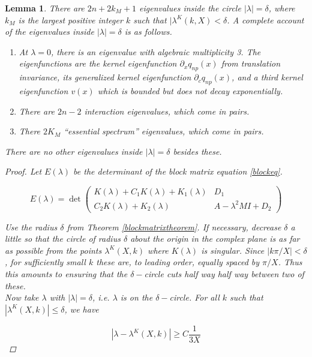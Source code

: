 \documentclass[12pt]{article}
\newtheorem{lemma}{Lemma}
\begin{document}
\begin{lemma}\label{eigcount}
There are $2n + 2 k_M + 1$ eigenvalues inside the circle $|\lambda| = \delta$, where $k_M$ is the largest positive integer $k$ such that $|\lambda^K(k,X) < \delta$. A complete account of the eigenvalues inside $|\lambda| = \delta$ is as follows.
\begin{enumerate}
	\item At $\lambda = 0$, there is an eigenvalue with algebraic multiplicity 3. The eigenfunctions are the kernel eigenfunction $\partial_x q_{np}(x)$ from translation invariance, its generalized kernel eigenfunction $\partial_c q_{np}(x)$, and a third kernel eigenfunction $v(x)$ which is bounded but does not decay exponentially.
	\item There are $2n - 2$ interaction eigenvalues, which come in pairs.
	\item There $2 K_M$ ``essential spectrum'' eigenvalues, which come in pairs.
\end{enumerate}
There are no other eigenvalues inside $|\lambda| = \delta$ besides these.

\begin{proof}
Let $E(\lambda)$ be the determinant of the block matrix equation \ref{blockeq}.

\begin{equation}
E(\lambda) = \det 
\begin{pmatrix}
K(\lambda) + C_1 K(\lambda) + K_1(\lambda) & D_1 \\
C_2 K(\lambda) + K_2(\lambda) & A - \lambda^2 MI + D_2
\end{pmatrix}
\end{equation}

Use the radius $\delta$ from Theorem \ref{blockmatrixtheorem}. If necessary, decrease $\delta$ a little so that the circle of radius $\delta$ about the origin in the complex plane is as far as possible from the points $\lambda^K(X, k)$ where $K(\lambda)$ is singular. Since $|k\pi/X| < \delta$, for sufficiently small $k$ these are, to leading order, equally spaced by $\pi /X$. Thus this amounts to ensuring that the $\delta-$circle cuts half way half way between two of these. \\

Now take $\lambda$ with $|\lambda| = \delta$, i.e. $\lambda$ is on the $\delta-$circle. For all $k$ such that $|\lambda^K(X, k)| \leq \delta$, we have

\[
| \lambda - \lambda^K(X, k)|  \geq C \frac{1}{3X}
\]


\end{proof}
\end{lemma}
\end{document}
